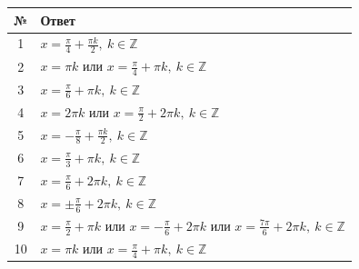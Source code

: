 \documentclass[a4paper,12pt]{article}
\newcommand{\Z}{\mathbb{Z}}
\begin{document}
\renewcommand{\arraystretch}{1.35}
\begin{tabularx}{\linewidth}{@{}cX@{}}
\toprule
№ & Ответ \\
\midrule
1 & \(x=\frac{\pi}{4}+\frac{\pi k}{2},\ k\in\Z\) \\
2 & \(x=\pi k\) или \(x=\frac{\pi}{4}+\pi k,\ k\in\Z\) \\
3 & \(x=\frac{\pi}{6}+\pi k,\ k\in\Z\) \\
4 & \(x=2\pi k\) или \(x=\frac{\pi}{2}+2\pi k,\ k\in\Z\) \\
5 & \(x=-\frac{\pi}{8}+\frac{\pi k}{2},\ k\in\Z\) \\
6 & \(x=\frac{\pi}{3}+\pi k,\ k\in\Z\) \\
7 & \(x=\frac{\pi}{6}+2\pi k,\ k\in\Z\) \\
8 & \(x=\pm\frac{\pi}{6}+2\pi k,\ k\in\Z\) \\
9 & \(x=\frac{\pi}{2}+\pi k\) или \(x=-\frac{\pi}{6}+2\pi k\) или \(x=\frac{7\pi}{6}+2\pi k,\ k\in\Z\) \\
10 & \(x=\pi k\) или \(x=\frac{\pi}{4}+\pi k,\ k\in\Z\) \\
\bottomrule
\end{tabularx}
\end{document}
